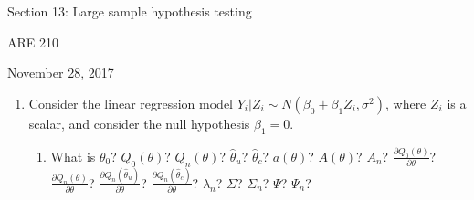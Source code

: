 \documentclass[12pt,english]{article}
\begin{document}
\begin{center}
{\Large{}Section 13: Large sample hypothesis testing}
\par\end{center}{\Large \par}

\begin{center}
ARE 210
\par\end{center}

\begin{center}
November 28, 2017
\par\end{center}

\begin{enumerate}
	\item Consider the linear regression model $Y_{i} | Z_{i} \sim N(\beta_{0} + \beta_{1} Z_{i}, \sigma^{2})$, where $Z_{i}$ is a scalar, and consider the null hypothesis $\beta_{1} = 0$.
	\begin{enumerate}
		\item What is $\theta_{0}$? $Q_{0}(\theta)$? $Q_{n}(\theta)$? $\hat{\theta}_{u}$? $\hat{\theta}_{c}$? $a(\theta)$? $A(\theta)$? $A_{n}$? $\frac{\partial Q_{0}(\theta)}{\partial \theta}$? $\frac{\partial Q_{n}(\theta)}{\partial \theta}$? $\frac{\partial Q_{n}(\hat{\theta}_{u})}{\partial \theta}$? $\frac{\partial Q_{n}(\hat{\theta}_{c})}{\partial \theta}$? $\lambda_{n}$? $\Sigma$? $\Sigma_{n}$? $\Psi$? $\Psi_{n}$?
		\vspace{1em}
		

\end{enumerate}
\end{enumerate}
\end{document}
